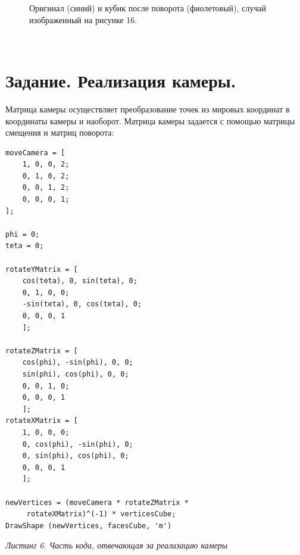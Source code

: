 \documentclass[a5paper, 10pt]{article}
\theoremstyle{definition}
\theoremstyle{plain}
\theoremstyle{remark}
\begin{document}
\begin{figure}[h!]
\caption{Оригинал (синий) и кубик после поворота (фиолетовый), случай изображенный на рисунке 16.}
\end{figure}




\newpage
\,
\newpage
\section{Задание. Реализация камеры.}
Матрица камеры осуществляет преобразование точек из мировых координат в координаты камеры и наоборот. Матрица камеры задается с помощью матрицы смещения и матриц поворота:
\begin{center}
\begin{lstlisting}
moveCamera = [
    1, 0, 0, 2;
    0, 1, 0, 2;
    0, 0, 1, 2;
    0, 0, 0, 1;
]; 

phi = 0;
teta = 0;

rotateYMatrix = [
    cos(teta), 0, sin(teta), 0;
    0, 1, 0, 0;
    -sin(teta), 0, cos(teta), 0;
    0, 0, 0, 1
    ];

rotateZMatrix = [
    cos(phi), -sin(phi), 0, 0;
    sin(phi), cos(phi), 0, 0;
    0, 0, 1, 0;
    0, 0, 0, 1
    ];
rotateXMatrix = [
    1, 0, 0, 0;
    0, cos(phi), -sin(phi), 0;
    0, sin(phi), cos(phi), 0;
    0, 0, 0, 1
    ];

newVertices = (moveCamera * rotateZMatrix *
	 rotateXMatrix)^(-1) * verticesCube;
DrawShape (newVertices, facesCube, 'm')
\end{lstlisting}
\textit{Листинг 6. Часть кода, отвечающая за реализацию камеры}
\end{center}
\end{document}
